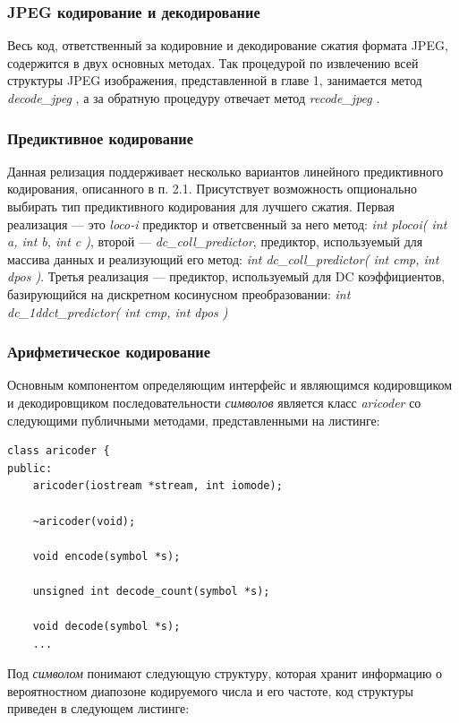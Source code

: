 \documentclass{matmex-diploma-custom}
\begin{document}
\subsubsection{JPEG кодирование и декодирование}
Весь код, ответственный за кодировние  и декодирование сжатия формата JPEG, содержится в двух основных методах. Так процедурой по извлечению всей структуры JPEG изображения, представленной в главе 1, занимается метод \emph{ decode\_jpeg }, а за обратную процедуру отвечает метод \emph{ recode\_jpeg }.

\subsubsection{Предиктивное кодирование}
Данная релизация поддерживает несколько вариантов линейного предиктивного кодирования, описанного в п. 2.1. Присутствует возможность опционально выбирать тип предиктивного кодирования для лучшего сжатия.
    Первая реализация --- это \emph{loco-i} предиктор и ответсвенный за него метод: \emph{int plocoi( int a, int b, int c )}, второй --- \emph{dc\_coll\_predictor}, предиктор, используемый для массива данных и реализующий его метод: \emph{int dc\_coll\_predictor( int cmp, int dpos )}. Третья реализация --- предиктор, используемый для DC коэффициентов, базирующийся на дискретном косинусном преобразовании: \emph{int dc\_1ddct\_predictor( int cmp, int dpos )}
\subsubsection{Арифметическое кодирование}
Основным компонентом определяющим интерфейс и являющимся кодировщиком и декодировщиком последовательности \emph{символов} является класс \emph{aricoder} со следующими публичными методами, представленными на листинге:


\begin{lstlisting}
class aricoder {
public:
    aricoder(iostream *stream, int iomode);

    ~aricoder(void);

    void encode(symbol *s);

    unsigned int decode_count(symbol *s);

    void decode(symbol *s);
    ...
\end{lstlisting}

Под \emph{символом} понимают следующую структуру, которая хранит информацию о вероятностном диапозоне кодируемого числа и его частоте, код структуры приведен в следующем листинге:
\end{document}
